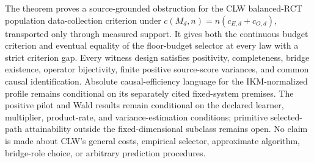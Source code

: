 The theorem proves a source-grounded obstruction for the CLW balanced-RCT population data-collection criterion under \(c(M_d,n)=n(c_{E,d}+c_{O,d})\), transported only through measured support. It gives both the continuous budget criterion and eventual equality of the floor-budget selector at every law with a strict criterion gap. Every witness design satisfies positivity, completeness, bridge existence, operator bijectivity, finite positive source-score variances, and common causal identification. Absolute causal-efficiency language for the IKM-normalized profile remains conditional on its separately cited fixed-system premises. The positive pilot and Wald results remain conditional on the declared learner, multiplier, product-rate, and variance-estimation conditions; primitive selected-path attainability outside the fixed-dimensional subclass remains open. No claim is made about CLW's general costs, empirical selector, approximate algorithm, bridge-role choice, or arbitrary prediction procedures.
